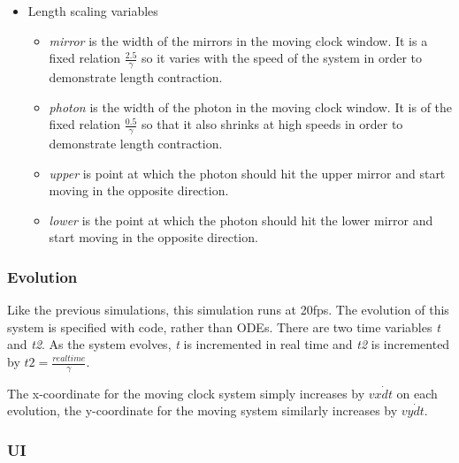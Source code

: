 \documentclass[11pt]{article}
\begin{document}
\begin{itemize}
\item Length scaling variables
\label{sec-3-3-1-2}%
\begin{itemize}
\item \emph{mirror} is the width of the mirrors in the moving clock window. It is a fixed relation $\frac{2.5}{\gamma}$ so it varies with the speed of the system in order to demonstrate length contraction.
\item \emph{photon} is the width of the photon in the moving clock window. It is of the fixed relation $\frac{0.5}{\gamma}$ so that it also shrinks at high speeds in order to demonstrate length contraction.
\item \emph{upper} is point at which the photon should hit the upper mirror and start moving in the opposite direction.
\item \emph{lower} is the point at which the photon should hit the lower mirror and start moving in the opposite direction.
\end{itemize}
\end{itemize} %
\subsubsection*{Evolution}
\label{sec-3-3-2}

    Like the previous simulations, this simulation runs at 20fps. The evolution of this system is specified with code, rather than ODEs. There are two time variables \emph{t} and \emph{t2}. As the system evolves, \emph{t} is incremented in real time and \emph{t2} is incremented by $t2 = \frac{real time}{\gamma}$.

    The x-coordinate for the moving clock system simply increases by $vx\dot dt$ on each evolution, the y-coordinate for the moving system similarly increases by $vy\dot dt$.
\subsubsection*{UI}
\label{sec-3-3-3}
\end{document}
